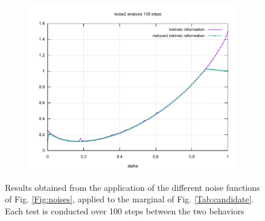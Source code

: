 \begin{figure}[h!]
\begin{subfigure}{\linewidth}
			\centering
			\includegraphics[scale=0.3]{images/graphs/noise2_FourPDstr_100.pdf}
		\end{subfigure}
		\caption{Results obtained from the application of the different noise functions of Fig. \ref{Fig:noises}, applied to the marginal of Fig. \ref{Tab:candidate}. Each test is conducted over 100 steps between the two behaviors}
\end{figure}



    
    